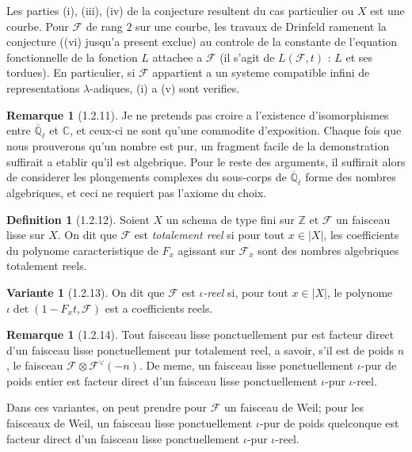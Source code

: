 \documentclass[12pt,a4paper]{article}
\theoremstyle{plain}
\theoremstyle{definition}
\newtheorem{definition}[theorem]{Definition}
\newtheorem{remarque}[theorem]{Remarque}
\newtheorem{var}[theorem]{Variante}
\theoremstyle{definition}
\theoremstyle{remark}
\begin{document}
Les parties (i), (iii), (iv) de la conjecture resultent du cas particulier ou $X$ est une courbe. Pour $\mathscr{F}$ de rang $2$ sur une courbe, les travaux de Drinfeld ramenent la conjecture ((vi) jusqu'a present exclue) au controle de la constante de l'equation fonctionnelle de la fonction $L$ attachee a $\mathscr{F}$ (il s'agit de $L(\mathscr{F}, t)$ : $L$ et ses tordues). En particulier, si $\mathscr{F}$ appartient a un systeme compatible infini de representations $\lambda$-adiques, (i) a (v) sont verifies.

\begin{remarque}[1.2.11]
Je ne pretends pas croire a l'existence d'isomorphismes entre $\overline{\mathbb{Q}}_\ell$ et $\mathbb{C}$, et ceux-ci ne sont qu'une commodite d'exposition. Chaque fois que nous prouverons qu'un nombre est pur, un fragment facile de la demonstration suffirait a etablir qu'il est algebrique. Pour le reste des arguments, il suffirait alors de considerer les plongements complexes du sous-corps de $\overline{\mathbb{Q}}_\ell$ forme des nombres algebriques, et ceci ne requiert pas l'axiome du choix.
\end{remarque}

\begin{definition}[1.2.12]
Soient $X$ un schema de type fini sur $\mathbb{Z}$ et $\mathscr{F}$ un faisceau lisse sur $X$. On dit que $\mathscr{F}$ est \emph{totalement reel} si pour tout $x \in |X|$, les coefficients du polynome caracteristique de $F_x$ agissant sur $\mathscr{F}_{\overline{x}}$ sont des nombres algebriques totalement reels.
\end{definition}

\begin{var}[1.2.13]
On dit que $\mathscr{F}$ est \emph{$\iota$-reel} si, pour tout $x \in |X|$, le polynome $\iota\det(1 - F_x t, \mathscr{F})$ est a coefficients reels.
\end{var}

\begin{remarque}[1.2.14]
Tout faisceau lisse ponctuellement pur est facteur direct d'un faisceau lisse ponctuellement pur totalement reel, a savoir, s'il est de poids $n$, le faisceau $\mathscr{F} \otimes \mathscr{F}^\vee(-n)$. De meme, un faisceau lisse ponctuellement $\iota$-pur de poids entier est facteur direct d'un faisceau lisse ponctuellement $\iota$-pur $\iota$-reel.

Dans ces variantes, on peut prendre pour $\mathscr{F}$ un faisceau de Weil; pour les faisceaux de Weil, un faisceau lisse ponctuellement $\iota$-pur de poids quelconque est facteur direct d'un faisceau lisse ponctuellement $\iota$-pur $\iota$-reel.
\end{remarque}
\end{document}
